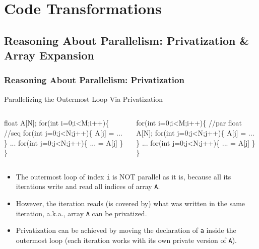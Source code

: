 \documentclass{beamer}
\newcommand{\emp}[1]{\textcolor{DikuRed}{ #1}}
\newcommand{\emphh}[1]{\textcolor{CosGreen}{ #1}}
\begin{document}
\section{Code Transformations}

\begin{frame}[fragile]
	\tableofcontents[currentsection]
\end{frame}

\subsection{Reasoning About Parallelism: Privatization \& Array Expansion}

\begin{frame}[fragile,t]
  \frametitle{Reasoning About Parallelism: Privatization} %

\vspace{-1ex}
\begin{block}{Parallelizing the Outermost Loop Via Privatization}
\begin{columns}
\begin{colorcode}
float A[N];
\emp{for(int i=0;i<M;i++)\{ //seq}
  for(int j=0;j<N;j++)\{
    A[j] = ...
  \}
  ...
  for(int j=0;j<N;j++)\{
    ... = A[j]
  \}  
\}
\end{colorcode}
\begin{colorcode}
\emphh{for(int i=0;i<M;i++)\{ //par}
  float A[N];
  for(int j=0;j<N;j++)\{
    A[j] = ...
  \}
  ...
  for(int j=0;j<N;j++)\{
    ... = A[j]
  \}  
\}
\end{colorcode}
\end{columns}
\end{block} 

\begin{itemize}
\item The outermost loop of index {\tt i} is NOT parallel as it is,
because all its iterations write and read all indices of
array {\tt A}.\smallskip

\item However, the  iteration reads (is covered by) what was 
written in the same iteration, a.k.a., array {\tt A} can be privatized.

\item Privatization can be achieved by moving the
declaration of {\tt a} inside the outermost loop
(each iteration works with its own private version of {\tt A}).
\end{itemize}

\end{frame}
\end{document}
